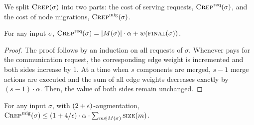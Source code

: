We split 
$\textsc{Crep}(\sigma)$ into two parts: the cost of serving requests, $\textsc{Crep}^\textnormal{req}(\sigma)$, 
and the cost of node migrations, $\textsc{Crep}^\textnormal{mig}(\sigma)$. 

\begin{lemma}
\label{lem:crep_req}
For any input $\sigma$, $\textsc{Crep}^\textnormal{req}(\sigma) = |M(\sigma)| \cdot \alpha + w(\textsc{final}(\sigma))$.
\end{lemma}

\begin{proof}
The proof follows by an induction on all requests of $\sigma$. Whenever
\CREP pays for the communication request, the corresponding edge weight is
incremented and both sides increase by $1$. At a time when $s$ components
are merged, $s-1$ merge actions are executed and the sum of all edge weights
decreases exactly by $(s-1) \cdot \alpha$. Then, the value of both sides
remain unchanged.
\end{proof}

\begin{lemma}
\label{lem:crep_mig}
For any input $\sigma$, with $(2+\epsilon)$-augmentation, 
$\textsc{Crep}^\textnormal{mig}(\sigma) \leq (1+4/\epsilon) \cdot \alpha \cdot \sum_{m \in M(\sigma)} \textsc{size}(m)$.
\end{lemma}

